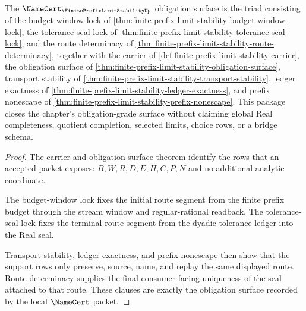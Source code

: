 \begin{theorem}
\label{thm:finite-prefix-limit-stability-namecert-obligation-triad}
The $\NameCert_{\FinitePrefixLimitStabilityUp}$ obligation surface is the triad consisting of the budget-window lock of \autoref{thm:finite-prefix-limit-stability-budget-window-lock}, the tolerance-seal lock of \autoref{thm:finite-prefix-limit-stability-tolerance-seal-lock}, and the route determinacy of \autoref{thm:finite-prefix-limit-stability-route-determinacy}, together with the carrier of \autoref{def:finite-prefix-limit-stability-carrier}, the obligation surface of \autoref{thm:finite-prefix-limit-stability-obligation-surface}, transport stability of \autoref{thm:finite-prefix-limit-stability-transport-stability}, ledger exactness of \autoref{thm:finite-prefix-limit-stability-ledger-exactness}, and prefix nonescape of \autoref{thm:finite-prefix-limit-stability-prefix-nonescape}. This package closes the chapter's obligation-grade surface without claiming global Real completeness, quotient completion, selected limits, choice rows, or a bridge schema.
\end{theorem}
\begin{proof}
The carrier and obligation-surface theorem identify the rows that an accepted packet exposes: $B,W,R,D,E,H,C,P,N$ and no additional analytic coordinate.

The budget-window lock fixes the initial route segment from the finite prefix budget through the stream window and regular-rational readback. The tolerance-seal lock fixes the terminal route segment from the dyadic tolerance ledger into the Real seal.

Transport stability, ledger exactness, and prefix nonescape then show that the support rows only preserve, source, name, and replay the same displayed route. Route determinacy supplies the final consumer-facing uniqueness of the seal attached to that route. These clauses are exactly the obligation surface recorded by the local $\NameCert$ packet.
\end{proof}

